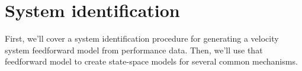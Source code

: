 
\chapter{System identification}

First, we'll cover a system identification procedure for generating a velocity
system feedforward model from performance data. Then, we'll use that feedforward
model to create state-space models for several common mechanisms.

\renewcommand*{\chapterpath}{\partpath/system-identification}





